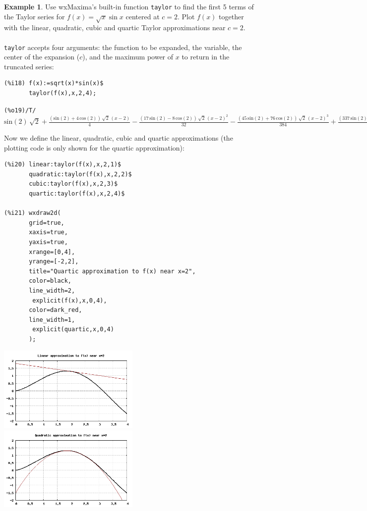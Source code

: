 \documentclass[10.5pt,twoside]{report}
\theoremstyle{definition}
\newtheorem{exmp}{Example}[section]
\begin{document}
\begin{exmp} Use wxMaxima's built-in function \verb|taylor| to find the first 5 terms of the Taylor series for $f(x)=\sqrt{x}\sin{x}$ centered at $c=2$.  Plot $f(x)$ together with the linear, quadratic, cubic and quartic Taylor approximations near $c=2$.\\

${}$\\
\verb|taylor| accepts four arguments:  the function to be expanded, the variable, the center of the expansion ($c$), and the maximum power of $x$ to return in the truncated series:

\begin{verbatim}
(%i18) f(x):=sqrt(x)*sin(x)$
       taylor(f(x),x,2,4);
\end{verbatim}
  
\verb|(%o19)/T/  |
$\mathrm{sin}\left( 2\right) \,\sqrt{2}+\frac{\left( \mathrm{sin}\left( 2\right) +4\,\mathrm{cos}\left( 2\right) \right) \,\sqrt{2}\,\left( x-2\right) }{4}-\frac{\left( 17\,\mathrm{sin}\left( 2\right) -8\,\mathrm{cos}\left( 2\right) \right) \,\sqrt{2}\,{\left( x-2\right) }^{2}}{32}-\frac{\left( 45\,\mathrm{sin}\left( 2\right) +76\,\mathrm{cos}\left( 2\right) \right) \,\sqrt{2}\,{\left( x-2\right) }^{3}}{384}+\frac{\left( 337\,\mathrm{sin}\left( 2\right) -208\,\mathrm{cos}\left( 2\right) \right) \,\sqrt{2}\,{\left( x-2\right) }^{4}}{6144}+...$

Now we define the linear, quadratic, cubic and quartic approximations (the plotting code is only shown for the quartic approximation):

\begin{verbatim}
(%i20) linear:taylor(f(x),x,2,1)$
       quadratic:taylor(f(x),x,2,2)$
       cubic:taylor(f(x),x,2,3)$
       quartic:taylor(f(x),x,2,4)$
       
(%i21) wxdraw2d(
       grid=true,
       xaxis=true,
       yaxis=true,
       xrange=[0,4],
       yrange=[-2,2],
       title="Quartic approximation to f(x) near x=2",
       color=black,
       line_width=2,
        explicit(f(x),x,0,4),
       color=dark_red,
       line_width=1,
        explicit(quartic,x,0,4)
       );
\end{verbatim}
\pagebreak

\includegraphics[width=2.7in]{example_6_4_6_1}
\includegraphics[width=2.7in]{example_6_4_6_2}


\end{exmp}
\end{document}
